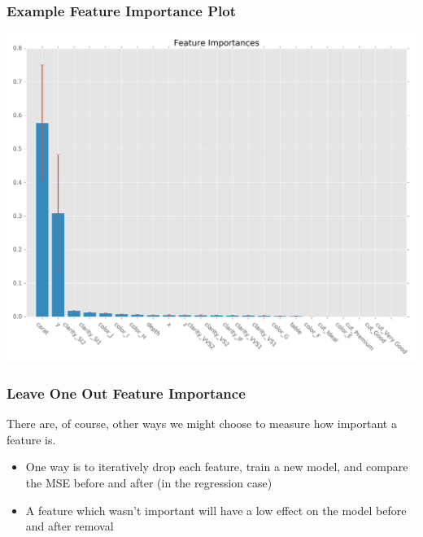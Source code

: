 \documentclass[table,dvipsnames]{beamer}
\begin{document}
\begin{frame}
\frametitle{Example Feature Importance Plot}
\begin{center}
\includegraphics[scale=0.35]{imgs/sklearn_feature_importance.png}
\end{center}
\end{frame}


\begin{frame}
\frametitle{Leave One Out Feature Importance}
There are, of course, other ways we might choose to measure how important a feature is.

\begin{itemize}
    \item One way is to iteratively drop each feature, train a new model, and compare the MSE before and after (in the regression case)
    \item A feature which wasn't important will have a low effect on the model before and after removal
\end{itemize}
\end{frame}

\end{document}
